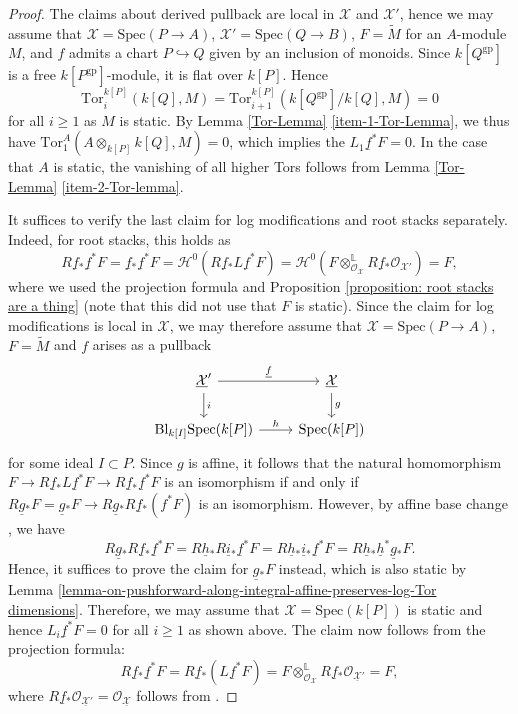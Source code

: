\documentclass[11pt]{amsart}
\theoremstyle{definition}
\theoremstyle{definition}
\newcommand{\ul}[1]{\underline{#1}}
\begin{document}
\begin{proof}
The claims about derived pullback are local in $\mathcal{X}$ and $\mathcal{X}'$, hence we may assume that $\mathcal{X}=\text{Spec}(P\rightarrow A)$, $\mathcal{X}'=\text{Spec}(Q\rightarrow B)$, $F=\widetilde{M}$ for an $A$-module $M$, and $f$ admits a chart $P\hookrightarrow Q$ given by an inclusion of monoids. Since $k[Q^{\text{gp}}]$ is a free $k[P^{\text{gp}}]$-module, it is flat over $k[P]$. Hence
\[\text{Tor}^{k[P]}_{i}(k[Q],M)=\text{Tor}^{k[P]}_{i+1}(k[Q^{\text{gp}}]/k[Q],M)=0\]
for all $i\geq 1$ as $M$ is static. By Lemma \ref{Tor-Lemma} \eqref{item-1-Tor-Lemma}, we thus have $\text{Tor}_{1}^{A}(A\otimes_{k[P]}k[Q],M)=0$, which implies the $L_{1}\ul{f}^{*}F=0$. In the case that $A$ is static, the vanishing of all higher Tors follows from Lemma \ref{Tor-Lemma} \eqref{item-2-Tor-lemma}.

It suffices to verify the last claim for log modifications and root stacks separately. Indeed, for root stacks, this holds as
\[
    R\ul{f}{}_*\ul{f}^*F = \ul{f}{}_*\ul{f}^*F = \mathcal{H}^0(R\ul{f}{}_*L\ul{f}^*F) = \mathcal{H}^0(F\otimes_{\mathcal{O}_\mathcal{\mathcal{X}}}^\mathbb{L} R\ul{f}{}_*\mathcal{O}_\mathcal{X'}) = F,
\]
where we used the projection formula \cite[Corollary 4.12]{HallRydh2017} and Proposition \ref{proposition: root stacks are a thing} (note that this did not use that $F$ is static). Since the claim for log modifications is local in $\mathcal{X}$, we may therefore assume that $\mathcal{X}=\text{Spec}(P\rightarrow A)$, $F=\widetilde{M}$ and $f$ arises as a pullback
$$
\begin{tikzcd}
\ul{\mathcal{X}}' \arrow[d, "i"] \arrow[r, "\ul{f}"]                & \ul{\mathcal{X}} \arrow[d, "g"]    \\
{\text{Bl}_{k[I]}\text{Spec}(k[P])} \arrow[r, "h"] & {\text{Spec}(k[P])}
\end{tikzcd}
$$
for some ideal $I\subset P$. Since $g$ is affine, it follows that the natural homomorphism $F\rightarrow R\ul{f}{}_{*}L\ul{f}^{*}F\rightarrow R\ul{f}{}_{*}\ul{f}^{*}F$ is an isomorphism if and only if $R\ul{g}{}_{*}F=\ul{g}{}_{*}F\rightarrow R\ul{g}{}_{*}R\ul{f}{}_{*}(f^{*}F)$ is an isomorphism. However, by affine base change \cite[02KG]{stacks}, we have 
\[R\underline{g}{}_{*}R\ul{f}{}_{*}\ul{f}^{*}F=R\ul{h}{}_{*}R\ul{i}{}_{*}\ul{f}^{*}F=R\ul{h}{}_{*}\ul{i}{}_{*}\ul{f}^{*}F=R\ul{h}{}_{*}\ul{h}^{*}\ul{g}{}_{*}F.\]
Hence, it suffices to prove the claim for $\ul{g}{}_{*}F$ instead, which is also static by Lemma \ref{lemma-on-pushforward-along-integral-affine-preserves-log-Tor dimensions}. Therefore, we may assume that $\mathcal{X}=\text{Spec}(k[P])$ is static and hence $L_{i}\ul{f}^{*}F=0$ for all $i\geq 1$ as shown above. The claim now follows from the projection formula:
\[R\ul{f}{}_{*}\ul{f}^{*}F=R\ul{f}{}_{*}(L\ul{f}^{*}F)=F\otimes_{\mathcal{O_\mathcal{X}}}^{\mathbb{L}}R\ul{f}{}_{*}\mathcal{O}_{\ul{\mathcal{X}}'}=F,\]
where 
$R\ul{f}{}_*\mathcal{O}_{\ul{\mathcal{X}}'}$$=\mathcal{O}_{\ul{\mathcal{X}}}$ 
follows from \cite[Theorem 11.3]{Toric-singularities-Kato}.
\end{proof}
\end{document}
